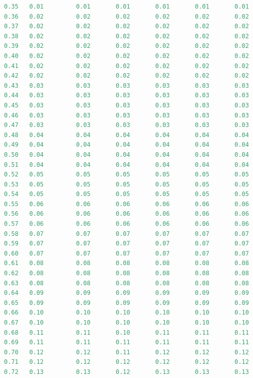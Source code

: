 \documentclass[12pt]{report}
\begin{document}
\begin{lstlisting}[language=Python]
0.35   0.01         0.01       0.01       0.01       0.01       0.01
0.36   0.02         0.02       0.02       0.02       0.02       0.02
0.37   0.02         0.02       0.02       0.02       0.02       0.02
0.38   0.02         0.02       0.02       0.02       0.02       0.02
0.39   0.02         0.02       0.02       0.02       0.02       0.02
0.40   0.02         0.02       0.02       0.02       0.02       0.02
0.41   0.02         0.02       0.02       0.02       0.02       0.02
0.42   0.02         0.02       0.02       0.02       0.02       0.02
0.43   0.03         0.03       0.03       0.03       0.03       0.03
0.44   0.03         0.03       0.03       0.03       0.03       0.03
0.45   0.03         0.03       0.03       0.03       0.03       0.03
0.46   0.03         0.03       0.03       0.03       0.03       0.03
0.47   0.03         0.03       0.03       0.03       0.03       0.03
0.48   0.04         0.04       0.04       0.04       0.04       0.04
0.49   0.04         0.04       0.04       0.04       0.04       0.04
0.50   0.04         0.04       0.04       0.04       0.04       0.04
0.51   0.04         0.04       0.04       0.04       0.04       0.04
0.52   0.05         0.05       0.05       0.05       0.05       0.05
0.53   0.05         0.05       0.05       0.05       0.05       0.05
0.54   0.05         0.05       0.05       0.05       0.05       0.05
0.55   0.06         0.06       0.06       0.06       0.06       0.06
0.56   0.06         0.06       0.06       0.06       0.06       0.06
0.57   0.06         0.06       0.06       0.06       0.06       0.06
0.58   0.07         0.07       0.07       0.07       0.07       0.07
0.59   0.07         0.07       0.07       0.07       0.07       0.07
0.60   0.07         0.07       0.07       0.07       0.07       0.07
0.61   0.08         0.08       0.08       0.08       0.08       0.08
0.62   0.08         0.08       0.08       0.08       0.08       0.08
0.63   0.08         0.08       0.08       0.08       0.08       0.08
0.64   0.09         0.09       0.09       0.09       0.09       0.09
0.65   0.09         0.09       0.09       0.09       0.09       0.09
0.66   0.10         0.10       0.10       0.10       0.10       0.10
0.67   0.10         0.10       0.10       0.10       0.10       0.10
0.68   0.11         0.11       0.10       0.11       0.11       0.11
0.69   0.11         0.11       0.11       0.11       0.11       0.11
0.70   0.12         0.12       0.11       0.12       0.12       0.12
0.71   0.12         0.12       0.12       0.12       0.12       0.12
0.72   0.13         0.13       0.12       0.13       0.13       0.13

\end{lstlisting}
\end{document}
